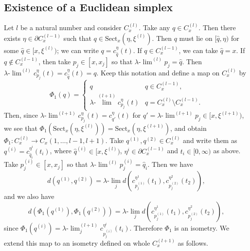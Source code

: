 \documentclass[12pt]{amsart}
\numberwithin{equation}{section}
\theoremstyle{plain}
\theoremstyle{definition}
\theoremstyle{remark}
\newcommand{\uulim}[1][]{\lambda{\text{-}}\!{\lim}^{(#1)}}
\newcommand{\ulim}{\lambda{\text{-}}\!\lim}
\newcommand{\p}[1]{p^{(#1)}}
\newcommand{\q}[1]{q^{(#1)}}
\newcommand{\xxi}[1]{\xi^{(#1)}}
\newcommand{\ray}[1]{[#1)}
\newcommand{\cc}[2]{c_{#1}^{#2}}
\newcommand{\sect}[3][]{\mathrm{Sect}_{#1}(#2,#3)}
\newcommand{\cone}[2][]{C_{#1}^{(#2)}}
\begin{document}
\subsection{Existence of a Euclidean simplex}
\label{sec:existence-simplex}

%
% 
 Let $l$ be a natural number and consider $\cone[x]{l}$.
 Take any $q \in \cone[x]{l}$. 
 Then there exists $\eta \in \partial \cone[x]{l-1}$ such that
 $q \in \sect[x]{\eta}{\xxi{l}}$. 
 Then $q$ must lie on $\ray{\hat q,\eta}$ for some 
 $\hat q \in \ray{x,\xxi{l}}$; 
 we can write $q = \cc{\hat q}{\eta}(t)$. 
 If $q \in \cone[x]{l-1}$, we can take $\hat q=x$.
 If $q \not\in \cone[x]{l-1}$, then 
 take $p_j \in [x,x_j]$ so that $\uulim[l] p_j=\hat q$. 
 Then $\uulim[l] \cc{p_j}{\eta}(t)= \cc{\hat q}{\eta}(t)=q$. 
 Keep this notation and define a map on $\cone[x]{l}$ by 
\begin{equation*}
 \Phi_1 (q) = 
 \begin{cases}
  q & q \in \cone[x]{l-1}, \\
  \uulim[l+1] c_{p_j}^{\eta}(t) & q= \cone[x]{l}\setminus 
  \cone[x]{l-1}. 
 \end{cases}
\end{equation*}
 Then, since $\uulim[l+1]\cc{p_j}{\eta}(t)=\cc{q'}{\eta}(t)$ for 
 $q' = \uulim[l+1] p_j \in \ray{x,\xxi{l+1}}$, 
 we see that 
 $\Phi_1(\sect[x]{\eta}{\xxi{l}}) = \sect[x]{\eta}{\xxi{l+1}}$, 
 and obtain
 $\Phi_1 \colon \cone[x]{l}\rightarrow C_{x}(1,\dots,l-1,l+1)$. 
 Take $\q{1}, \q{2} \in \cone[x]{l}$ and write them as
 $\q{i} = \cc{\hat q_i}{\eta^i}(t_i)$, where
 $\hat q^{(i)} \in \ray{x,\xxi{l}}$, 
 $\eta^i \in \partial \cone[x]{l-1}$ and 
 $t_i \in \ray{0,\infty}$ as above. 
 Take $\p{i}_j \in [x,x_j]$ so that 
 $\uulim[l] p_j^{(i)}=\hat q_i$. 
 Then we have 
 \begin{equation*}
   d(\q{1},\q{2})=
  \ulim_j d(\cc{\p{1}_j}{\eta^1}(t_1), \cc{\p{2}_j}{\eta^2}(t_2)), 
 \end{equation*}
 and we also have
\begin{equation*}
   d(\Phi_1(\q{1}), \Phi_1(\q{2}))
  =\ulim_j d(\cc{\p{1}_j}{\eta^1}(t_1), \cc{\p{2}_j}{\eta^2}(t_2)), 
\end{equation*}
 since 
 $\Phi_1(\q{i})=\uulim[l+1]_j \cc{\p{i}_j}{\eta^i}(t_i)$. 
 Therefore $\Phi_1$ is an isometry. 
 We extend this map to an isometry defined on whole $\cone[x]{l+1}$ as
 follows. 
\end{document}

